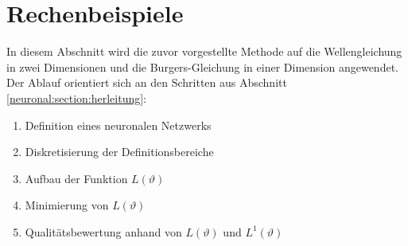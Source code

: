 %
%
%
%

\section{Rechenbeispiele}\label{neuronal:section:rechenbeispiel}

In diesem Abschnitt wird die zuvor vorgestellte Methode auf die Wellengleichung in zwei Dimensionen und die Burgers-Gleichung in einer Dimension angewendet.
Der Ablauf orientiert sich an den Schritten aus Abschnitt \ref{neuronal:section:herleitung}:
\begin{enumerate}
    \item Definition eines neuronalen Netzwerks
    \item Diskretisierung der Definitionsbereiche
    \item Aufbau der Funktion $L(\vartheta)$
    \item Minimierung von $L(\vartheta)$
    \item Qualitätsbewertung anhand von $L(\vartheta)$ und $L^1(\vartheta)$
\end{enumerate}

